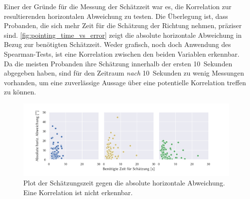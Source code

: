 Einer der Gründe für die Messung der Schätzzeit war es, die Korrelation zur resultierenden horizontalen Abweichung zu testen.
Die Überlegung ist, dass Probanden, die sich mehr Zeit für die Schätzung der Richtung nehmen, präziser sind.
\autoref{fig:pointing_time_vs_error} zeigt die absolute horizontale Abweichung in Bezug zur benötigten Schätzzeit.
Weder grafisch, noch doch Anwendung des Spearman-Tests, ist eine Korrelation zwischen den beiden Variablen erkennbar.
Da die meisten Probanden ihre Schätzung innerhalb der ersten 10~Sekunden abgegeben haben, sind für den Zeitraum \emph{nach} 10~Sekunden zu wenig Messungen vorhanden, um eine zuverlässige Aussage über eine potentielle Korrelation treffen zu können.
\begin{figure}[hb]
    \centering
    \includegraphics[width=\linewidth]{figures/analysis/pointing_time_vs_error}
    \caption{Plot der Schätzungszeit gegen die absolute horizontale Abweichung. %
    Eine Korrelation ist nicht erkennbar.}
    \label{fig:pointing_time_vs_error}
\end{figure}

